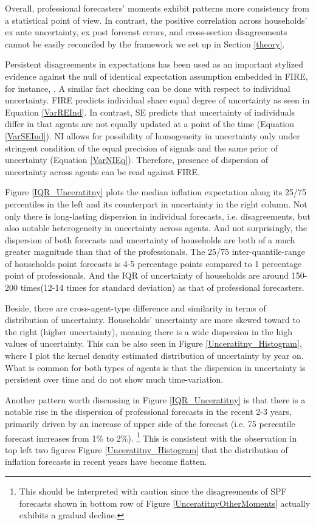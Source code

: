 \documentclass[]{article}
\begin{document}
	Overall, professional forecasters' moments exhibit patterns more consistency from a statistical point of view.  In contrast, the positive correlation across households' ex ante uncertainty, ex post forecast errors, and cross-section disagreements cannot be easily reconciled by the framework we set up in Section \ref{theory}. 
	
	Persistent disagreements in expectations has been used as an important stylized evidence against the null of identical expectation assumption embedded in FIRE, for instance, \citet{mankiw2003disagreement}. A similar fact checking can be done with respect to individual uncertainty. FIRE predicts individual share equal degree of uncertainty as  seen in Equation \ref{VarREInd}. In contrast, SE predicts that uncertainty of individuals differ in that agents are not equally updated at a point of the time (Equation \ref{VarSEInd}). NI allows for possibility of homogeneity in uncertainty only under stringent condition of the equal precision of signals and the same prior of uncertainty (Equation \ref{VarNIEq}). Therefore, presence of dispersion of uncertainty across agents can be read against FIRE.  
	
	Figure \ref{IQR_Unceratitny} plots the median inflation expectation along its 25/75 percentiles in the left and its counterpart in uncertainty in the right column.  Not only there is long-lasting dispersion in individual forecasts, i.e. disagreements, but also notable heterogeneity in uncertainty across agents.  And not surprisingly, the dispersion of both forecasts and uncertainty of households are both of a much greater magnitude than that of the professionals. The 25/75 inter-quantile-range of households point forecasts is 4-5 percentage points compared to 1 percentage point of professionals. And the IQR of uncertainty of households are around 150-200 times(12-14 times for standard deviation) as that of professional forecasters.  
	
	Beside, there are cross-agent-type difference and similarity in terms of distribution of uncertainty. Households' uncertainty are more skewed toward to the right (higher uncertainty), meaning there is a wide dispersion in the high values of uncertainty. This can be also seen in Figure \ref{Unceratitny_Histogram}, where I plot the kernel density estimated distribution of uncertainty by year on. What is common for both types of agents is that the dispersion in uncertainty is persistent over time and do not show much time-variation.  
	
	Another pattern worth discussing in Figure \ref{IQR_Unceratitny} is that there is a notable rise in the dispersion of professional forecasts in the recent 2-3 years, primarily driven by an increase of upper side of the forecast (i.e. 75 percentile forecast increases from 1\% to 2\%). \footnote{This should be interpreted with caution since the disagreements of SPF forecasts shown in bottom row of Figure \ref{UnceratitnyOtherMoments} actually exhibits a gradual decline. } This is consistent with the observation in top left two figures Figure \ref{Unceratitny_Histogram} that the distribution of inflation forecasts in recent years have become flatten.
	
\end{document}
